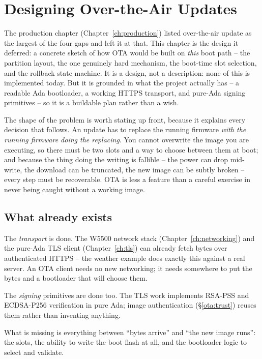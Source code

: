 \chapter{Designing Over-the-Air Updates}
\label{ch:ota}

The production chapter (Chapter~\ref{ch:production}) listed over-the-air update as
the largest of the four gaps and left it at that. This chapter is the design it
deferred: a concrete sketch of how OTA would be built on \emph{this} boot path --
the partition layout, the one genuinely hard mechanism, the boot-time slot
selection, and the rollback state machine. It is a design, not a description: none
of this is implemented today. But it is grounded in what the project actually has --
a readable Ada bootloader, a working HTTPS transport, and pure-Ada signing
primitives -- so it is a buildable plan rather than a wish.

The shape of the problem is worth stating up front, because it explains every
decision that follows. An update has to replace the running firmware \emph{with the
running firmware doing the replacing}. You cannot overwrite the image you are
executing, so there must be two slots and a way to choose between them at boot; and
because the thing doing the writing is fallible -- the power can drop mid-write, the
download can be truncated, the new image can be subtly broken -- every step must be
recoverable. OTA is less a feature than a careful exercise in never being caught
without a working image.

\section{What already exists}

The \emph{transport} is done. The W5500 network stack (Chapter~\ref{ch:networking})
and the pure-Ada TLS client (Chapter~\ref{ch:tls}) can already fetch bytes over
authenticated HTTPS -- the weather example does exactly this against a real server.
An OTA client needs no new networking; it needs somewhere to put the bytes and a
bootloader that will choose them.

The \emph{signing} primitives are done too. The TLS work implements RSA-PSS and
ECDSA-P256 verification in pure Ada; image authentication (\S\ref{ota:trust}) reuses
them rather than inventing anything.

What is missing is everything between ``bytes arrive'' and ``the new image runs'':
the slots, the ability to write the boot flash at all, and the bootloader logic to
select and validate.

